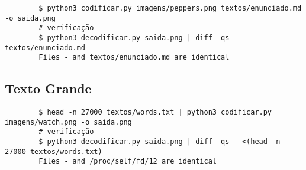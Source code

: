     \begin{verbatim}
        $ python3 codificar.py imagens/peppers.png textos/enunciado.md -o saida.png
        # verificação
        $ python3 decodificar.py saida.png | diff -qs - textos/enunciado.md
        Files - and textos/enunciado.md are identical
    \end{verbatim}

\subsection{Texto Grande}

    

    \begin{verbatim}
        $ head -n 27000 textos/words.txt | python3 codificar.py imagens/watch.png -o saida.png
        # verificação
        $ python3 decodificar.py saida.png | diff -qs - <(head -n 27000 textos/words.txt)
        Files - and /proc/self/fd/12 are identical
    \end{verbatim}

%
%
%

